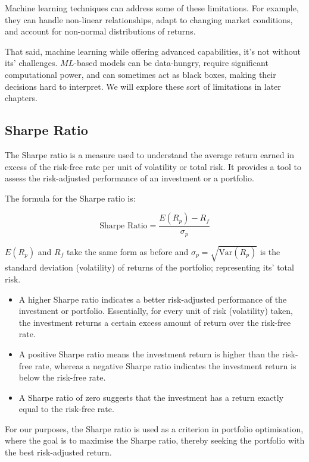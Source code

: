\documentclass[a4paper,12pt,titlepage]{article}
\numberwithin{equation}{section}
\begin{document}
Machine learning techniques can address some of these limitations. For example, 
they can handle non-linear relationships, adapt to changing market conditions, and account for 
non-normal distributions of returns. \newline \par \noindent That said, machine learning while 
offering advanced capabilities, it's not without its' challenges. $ML$-based models can be data-hungry, 
require significant computational power, and can sometimes act as black boxes, 
making their decisions hard to interpret. We will explore these sort of limitations in later chapters.

\subsection{Sharpe Ratio}

\begin{tcolorbox}[title=\textbf{The Sharpe Ratio}]

	The Sharpe ratio is a measure used to understand the average return earned in excess of 
	the risk-free rate per unit of volatility or total risk. It provides a tool to assess the 
	risk-adjusted performance of an investment or a portfolio. \newline \par \noindent The formula 
	for the Sharpe ratio is:

	$$ \text{Sharpe Ratio} = \frac{E(R_p) - R_f}{\sigma_{p}} $$

	$E(R_p)$ and $R_f$ take the same form as before and $\sigma_{p} = \sqrt{\text{Var}(R_p)}$ is 
	the standard deviation (volatility) of returns of the portfolio; representing its' total risk.

	\begin{itemize}

		\item A higher Sharpe ratio indicates a better risk-adjusted performance of the investment 
			or portfolio. Essentially, for every unit of risk (volatility) taken, the investment 
			returns a certain excess amount of return over the risk-free rate.

		\item A positive Sharpe ratio means the investment return is higher than the risk-free rate, 
			whereas a negative Sharpe ratio indicates the investment return is below the risk-free 
			rate.
		
		\item A Sharpe ratio of zero suggests that the investment has a return exactly equal to the 
			risk-free rate.
	
	\end{itemize}

	For our purposes, the Sharpe ratio is used as a criterion in portfolio optimisation, where the 
	goal is to maximise the Sharpe ratio, thereby seeking the portfolio with the best risk-adjusted return.

\end{tcolorbox}
\end{document}
